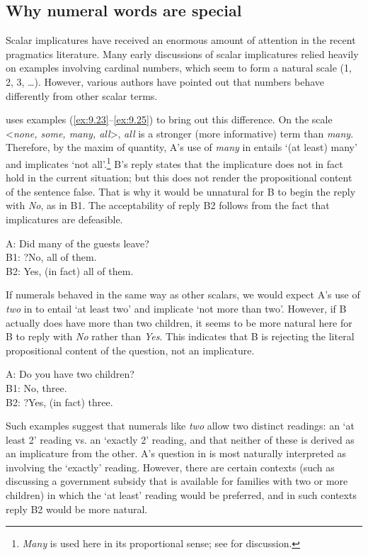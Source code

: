 \subsection{Why numeral words are special}\label{sec:9.4.1}

\largerpage[-1]
Scalar implicatures have received an enormous amount of attention in the recent pragmatics literature. Many early discussions of scalar implicatures relied heavily on examples involving cardinal numbers, which seem to form a natural scale (1, 2, 3, …). However, various authors have pointed out that numbers behave differently from other scalar terms.



\citet{Horn2004} uses examples (\ref{ex:9.23}--\ref{ex:9.25}) to bring out this difference. On the scale <\textit{none, some, many, all}>,  \textit{all} is a stronger (more informative) term than \textit{many}. Therefore, by the maxim of quantity, A’s use of \textit{many} in  entails ‘(at least) many’ and implicates ‘not all’.\footnote{\textit{Many} is used here in its proportional sense; see  for discussion.} B’s reply states that the implicature does not in fact hold in the current situation; but this does not render the propositional content of the sentence false. That is why it would be unnatural for B to begin the reply with \textit{No}, as in B1. The acceptability of reply B2 follows from the fact that implicatures are defeasible.


\ea \label{ex:9.23}
A: Did many of the guests leave?\\
B1: ?No, all of them.\\
B2: Yes, (in fact) all of them.
\z


If numerals behaved in the same way as other scalars, we would expect A’s use of \textit{two} in  to entail ‘at least two’ and implicate ‘not more than two’. However, if B actually does have more than two children, it seems to be more natural here for B to reply with \textit{No} rather than \textit{Yes}. This indicates that B is rejecting the literal propositional content of the question, not an implicature.


\ea \label{ex:9.24}
A: Do you have two children?\\
B1: No, three.\\
B2: ?Yes, (in fact) three.
\z


Such examples suggest that numerals like \textit{two} allow two distinct readings: an ‘at least 2’ reading vs. an ‘exactly 2’ reading, and that neither of these is derived as an implicature from the other. A’s question in  is most naturally interpreted as involving the ‘exactly’ reading. However, there are certain contexts (such as discussing a government subsidy that is available for families with two or more children) in which the ‘at least’ reading would be preferred, and in such contexts reply B2 would be more natural.

